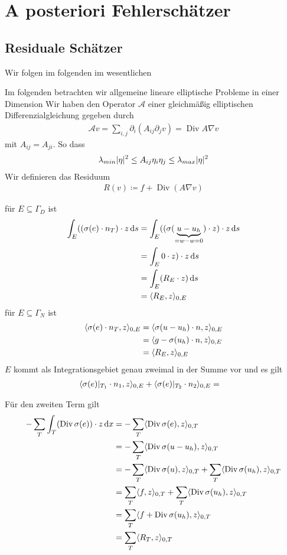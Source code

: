 \documentclass{scrartcl}
\newcommand{\cA}{\mathcal{A}}
\newcommand{\dif}[1]{\,\mathrm{d} #1}
\DeclareMathOperator{\diver}{Div}			%
\DeclarePairedDelimiter{\abs}{|}{|}
\DeclarePairedDelimiter{\inner}{\langle}{\rangle}
\begin{document}
\section{A posteriori Fehlerschätzer}
\subsection*{Residuale Schätzer}

Wir folgen im folgenden im wesentlichen \cite{Bra-2007, Nei-2004}

Im folgenden betrachten wir allgemeine lineare elliptische Probleme in einer Dimension
Wir haben den Operator $\cA$ einer gleichmäßig elliptischen Differenzialgleichung gegeben durch
\begin{align*}
	\cA v = \sum_{i,j}\partial_i(A_{ij}\partial_jv) = \diver A\nabla v
\end{align*}
mit $A_{ij}=A_{ji}$. So dass
\begin{align*}
	\lambda_{min}\abs{\eta}^2\leq A_{ij}\eta_i\eta_j\leq \lambda_{max}\abs{\eta}^2
\end{align*}
Wir definieren das Residuum
\begin{align*}
	R(v)\coloneqq f+\diver(A\nabla v)
\end{align*}


	für $E\subseteq\Gamma_D$ ist
	\begin{align*}
		\int_{E}((\sigma(e)\cdot n_T)\cdot z\dif s
		&= \int_{E}((\sigma(\underbrace{u-u_h}_{=w-w=0})\cdot z)\cdot z\dif s \\
		&= \int_{E}0\cdot z)\cdot z\dif s \\
		&= \int_{E}(R_E\cdot z)\dif s \\
		&= \inner{R_E,z}_{0,E}
	\end{align*}
	für $E\subseteq\Gamma_N$ ist
	\begin{align*}
		\inner{\sigma(e)\cdot n_T,z}_{0,E}
		&= \inner{\sigma(u-u_h)\cdot n,z}_{0,E}\\
		&= \inner{g-\sigma(u_h)\cdot n,z}_{0,E} \\
		&= \inner{R_E,z}_{0,E}
	\end{align*} $E$ kommt als Integrationsgebiet genau zweimal in der Summe vor und es gilt
	\begin{align*}
		\inner{\sigma(e)\vert_{T_1}\cdot n_1,z}_{0,E}+\inner{\sigma(e)\vert_{T_2}\cdot n_2}_{0,E}
		&= 
	\end{align*}
	
	
	Für den zweiten Term gilt
	\begin{align*}
		-\sum_T\int_T(\diver \sigma(e))\cdot z\dif x
		&= -\sum_T\inner{\diver \sigma(e),z}_{0,T} \\
		&= -\sum_T\inner{\diver \sigma(u-u_h),z}_{0,T} \\
		&= -\sum_T\inner{\diver \sigma(u),z}_{0,T} +\sum_T\inner{\diver \sigma(u_h),z}_{0,T} \\
		&= \sum_T\inner{f,z}_{0,T} +\sum_T\inner{\diver \sigma(u_h),z}_{0,T} \\
		&= \sum_T\inner{f+\diver \sigma(u_h),z}_{0,T} \\
		&= \sum_T\inner{R_T,z}_{0,T}
	\end{align*}
\end{document}
